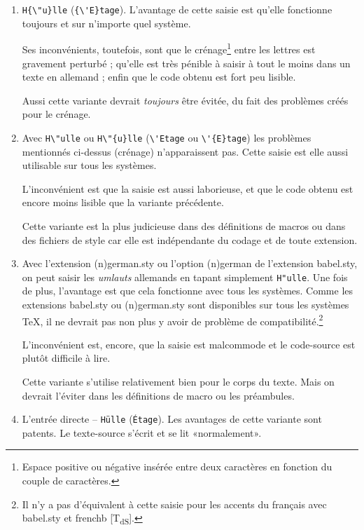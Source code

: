 \documentclass[fontsize=11pt, paper=a4, pagesize, captions=tableheading, numbers=enddot, toc=graduated, footnotes=multiple]{scrartcl}%
\newcommand{\Paket}[1]{\textsf{#1.sty}\xspace}
\newcommand{\Option}[1]{\textsf{#1}\xspace}
\newcommand{\NDT}{[T\textsubscript{dS}].} %
\begin{document}
\begin{enumerate}[wide]
\item \verb+H{\"u}lle+ (\verb+{\'E}tage+). L’avantage de cette saisie est qu’elle fonctionne toujours et sur n’importe quel système.

  Ses inconvénients, toutefois, sont que le crénage\footnote{Espace positive ou négative insérée entre deux caractères en fonction du couple de caractères.} entre les lettres est gravement perturbé ; qu’elle est très pénible à saisir à tout le moins dans un texte en allemand ; enfin que le code obtenu est fort peu lisible.

  Aussi cette variante devrait \emph{toujours} être évitée, du fait des problèmes créés pour le crénage.

  \item Avec \verb+H\"ulle+ ou \verb+H\"{u}lle+ (\verb!\'Etage! ou \verb!\'{E}tage!) les problèmes mentionnés ci-dessus (crénage) n'apparaissent pas. Cette saisie est elle aussi utilisable sur tous les systèmes.

  L’inconvénient est que la saisie est aussi laborieuse, et que le code obtenu est encore moins lisible que la variante précédente.

  Cette variante est la plus judicieuse dans des définitions de macros ou dans des fichiers de style car elle est indépendante du codage et de toute extension.\label{item:die-eingabe-der}

\item Avec l'extension \Paket{(n)german} ou l'option \Option{(n)german} de l'extension \Paket{babel}, on peut saisir les \emph{umlauts} allemands en tapant simplement \verb+H"ulle+. Une fois de plus, l'avantage est que cela fonctionne avec tous les systèmes. Comme les extensions \Paket{babel} ou \Paket{(n)german} sont disponibles sur tous les systèmes \TeX, il ne devrait pas non plus y avoir de problème de compatibilité.\footnote{Il n'y a pas d'équivalent à cette saisie pour les accents du français avec \Paket{babel} et \Option{frenchb} \NDT}

  L’inconvénient est, encore, que la saisie est malcommode et le code-source est plutôt difficile à lire.

  Cette variante s’utilise relativement bien pour le corps du texte. Mais on devrait l'éviter dans les définitions de macro ou les préambules.

\item L'entrée directe – \verb+Hülle+ (\verb!Étage!). Les avantages de cette variante sont patents. Le texte-source s’écrit et se lit «normalement».


\end{enumerate}
\end{document}
